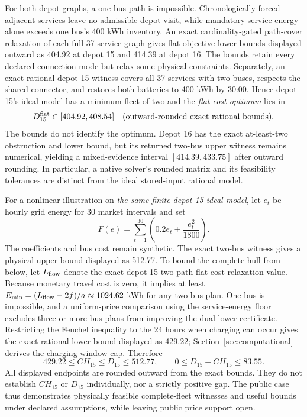 For both depot graphs, a one-bus path is impossible.  Chronologically
forced adjacent services leave no admissible depot visit, while mandatory
service energy alone exceeds one bus's 400 kWh inventory.
An exact cardinality-gated path-cover relaxation of each full 37-service
graph gives flat-objective lower bounds displayed outward as 404.92 at depot
15 and 414.39 at depot 16.  The bounds retain every declared connection
mode but relax some physical constraints.  Separately, an exact rational
depot-15 witness covers all 37 services with two buses, respects the shared
connector, and restores both batteries to 400 kWh by 30:00.  Hence depot 15's ideal
model has a minimum fleet of two and the \emph{flat-cost optimum} lies in
\begin{equation}\label{eq:public-flat}
 D^{\rm flat}_{15}\in[404.92,408.54]
 \quad\text{(outward-rounded exact rational bounds).}
\end{equation}
The bounds do not identify the optimum.  Depot 16 has the exact
at-least-two obstruction and lower bound, but its returned two-bus upper
witness remains numerical, yielding a mixed-evidence interval
$[414.39,433.75]$ after outward rounding.  In
particular, a native solver's rounded matrix and its feasibility tolerances
are distinct from the ideal stored-input rational model.

For a nonlinear illustration on \emph{the same finite depot-15 ideal
model}, let $e_t$ be hourly grid energy for 30 market intervals and set
\begin{equation}\label{eq:public-quadratic}
 F(e)=\sum_{t=1}^{30}\left(0.2e_t+\frac{e_t^2}{1800}\right).
\end{equation}
The coefficients and bus cost remain synthetic.  The exact two-bus witness
gives a physical upper bound displayed as 512.77.  To bound the complete
hull from below, let $L_{\rm flow}$ denote the exact depot-15 two-path
flat-cost relaxation value.  Because monetary travel cost is zero, it
implies at least $E_{\min}=(L_{\rm flow}-2f)/a\approx1024.62$ kWh for any
two-bus plan.  One bus is impossible, and a uniform-price comparison using
the service-energy floor excludes three-or-more-bus plans from improving the
dual lower certificate. Restricting the Fenchel inequality to the 24 hours
when charging can occur gives the exact rational lower bound displayed as
429.22; Section~\ref{sec:computational} derives the charging-window cap.
Therefore
\begin{equation}\label{eq:public-nonlinear}
 429.22\leq CH_{15}\leq D_{15}\leq512.77,
 \qquad 0\leq D_{15}-CH_{15}\leq83.55.
\end{equation}
All displayed endpoints are rounded outward from the exact bounds.  They
do not establish $CH_{15}$ or $D_{15}$ individually, nor a strictly positive
gap.  The public case thus demonstrates physically feasible complete-fleet
witnesses and useful bounds under declared assumptions, while leaving
public price support open.
